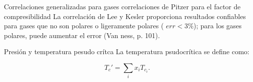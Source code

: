 \documentclass{article}
\begin{document}
Correlaciones generalizadas para gases
correlaciones de Pitzer para el factor de compresibilidad
La correlación de Lee y Kesler proporciona resultados confiables para gases que no son polares o ligeramente polares ( $err < 3\% $);
para los gases polares, puede aumentar el error (Van ness, p. 101).

Presión y temperatura pesudo crítca
La temperatura psudocrítica se define como:

  \begin{equation}
    T_c' = \sum_i x_i T_{c_i}.  
  \end{equation}
\end{document}

